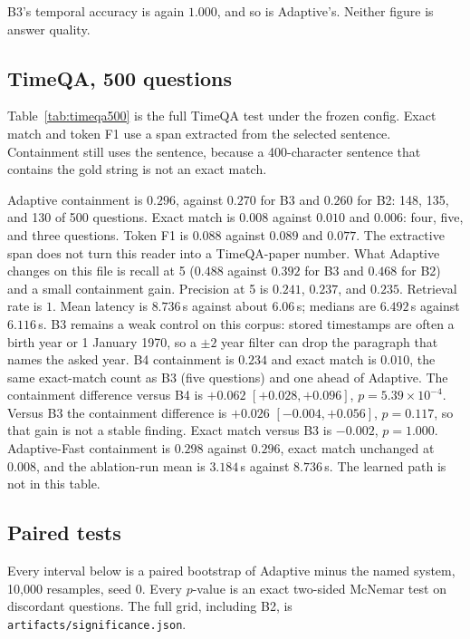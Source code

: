 \documentclass[11pt]{article}
\begin{document}
B3's temporal accuracy is again $1.000$, and so is Adaptive's.
Neither figure is answer quality.

\subsection{TimeQA, 500 questions}

Table~\ref{tab:timeqa500} is the full TimeQA test under the frozen config.
Exact match and token F1 use a span extracted from the selected sentence.
Containment still uses the sentence, because a 400-character sentence that contains the gold string is not an exact match.

Adaptive containment is $0.296$, against $0.270$ for B3 and $0.260$ for B2: 148, 135, and 130 of 500 questions.
Exact match is $0.008$ against $0.010$ and $0.006$: four, five, and three questions.
Token F1 is $0.088$ against $0.089$ and $0.077$.
The extractive span does not turn this reader into a TimeQA-paper number.
What Adaptive changes on this file is recall at 5 ($0.488$ against $0.392$ for B3 and $0.468$ for B2) and a small containment gain.
Precision at 5 is $0.241$, $0.237$, and $0.235$.
Retrieval rate is $1$.
Mean latency is $8.736$\,s against about $6.06$\,s; medians are $6.492$\,s against $6.116$\,s.
B3 remains a weak control on this corpus: stored timestamps are often a birth year or 1 January 1970, so a $\pm 2$ year filter can drop the paragraph that names the asked year.
B4 containment is $0.234$ and exact match is $0.010$, the same exact-match count as B3 (five questions) and one ahead of Adaptive.
The containment difference versus B4 is $+0.062$ $[+0.028, +0.096]$, $p=5.39\times 10^{-4}$.
Versus B3 the containment difference is $+0.026$ $[ -0.004, +0.056 ]$, $p=0.117$, so that gain is not a stable finding.
Exact match versus B3 is $-0.002$, $p=1.000$.
Adaptive-Fast containment is $0.298$ against $0.296$, exact match unchanged at $0.008$, and the ablation-run mean is $3.184$\,s against $8.736$\,s.
The learned path is not in this table.

\subsection{Paired tests}
\label{sec:sig}

Every interval below is a paired bootstrap of Adaptive minus the named system, 10{,}000 resamples, seed 0.
Every $p$-value is an exact two-sided McNemar test on discordant questions.
The full grid, including B2, is \texttt{artifacts/significance.json}.
\end{document}
